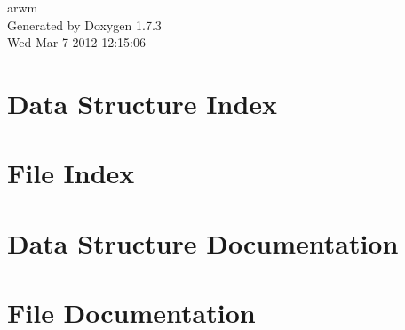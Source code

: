 \documentclass[a4paper]{book}
\begin{document}
\hypersetup{pageanchor=false}
\begin{titlepage}
\vspace*{7cm}
\begin{center}
{\Large arwm }\\
\vspace*{1cm}
{\large Generated by Doxygen 1.7.3}\\
\vspace*{0.5cm}
{\small Wed Mar 7 2012 12:15:06}\\
\end{center}
\end{titlepage}
\clearemptydoublepage
{}
\tableofcontents
\clearemptydoublepage
{}
\hypersetup{pageanchor=true}
\chapter{Data Structure Index}

\chapter{File Index}

\chapter{Data Structure Documentation}









\chapter{File Documentation}






































\printindex
\end{document}
